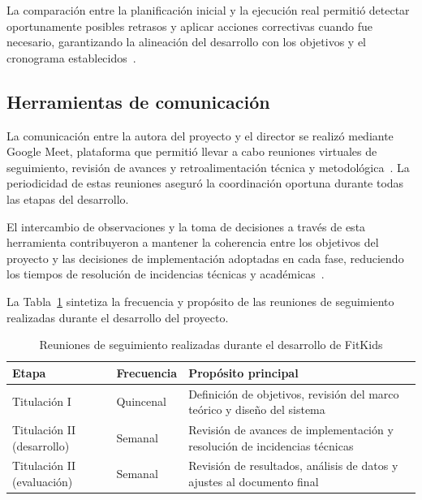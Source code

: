 				La comparación entre la planificación inicial y la ejecución real permitió detectar oportunamente posibles retrasos y aplicar acciones correctivas cuando fue necesario, garantizando la alineación del desarrollo con los objetivos y el cronograma establecidos~\cite{Fowler2002}.
				
			\subsection{Herramientas de comunicación}
				La comunicación entre la autora del proyecto y el director se realizó mediante Google Meet, plataforma que permitió llevar a cabo reuniones virtuales de seguimiento, revisión de avances y retroalimentación técnica y metodológica~\cite{GuerreroUlloa2024}. La periodicidad de estas reuniones aseguró la coordinación oportuna durante todas las etapas del desarrollo.
				
				El intercambio de observaciones y la toma de decisiones a través de esta herramienta contribuyeron a mantener la coherencia entre los objetivos del proyecto y las decisiones de implementación adoptadas en cada fase, reduciendo los tiempos de resolución de incidencias técnicas y académicas~\cite{Fowler2002,GuerreroUlloa2024}.
				
				La Tabla~\ref{tab:reuniones} sintetiza la frecuencia y propósito de las reuniones de seguimiento realizadas durante el desarrollo del proyecto.
				
				\begin{table}[H]
					\centering
					\small
					\caption{Reuniones de seguimiento realizadas durante el desarrollo de FitKids}
					\label{tab:reuniones}
					\begin{tabular}{p{4.1cm}p{2.5cm}p{7.2cm}}
						\hline
						\textbf{Etapa} & \textbf{Frecuencia} & \textbf{Propósito principal} \\
						\hline
						Titulación I & Quincenal & Definición de objetivos, revisión del marco teórico y diseño del sistema \\
						
						Titulación II (desarrollo) & Semanal & Revisión de avances de implementación y resolución de incidencias técnicas \\
						
						Titulación II (evaluación) & Semanal & Revisión de resultados, análisis de datos y ajustes al documento final \\
						\hline
					\end{tabular}
				\end{table}
				\tblnote
				
